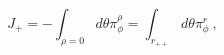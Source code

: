 \begin{equation}
J_+ = -\int_{\rho=0} d\theta \pi^{\rho}_{\phi} =
\int_{r_{++}} d\theta \pi^{r}_{\phi} \ ,
\label{j}
\end{equation}

